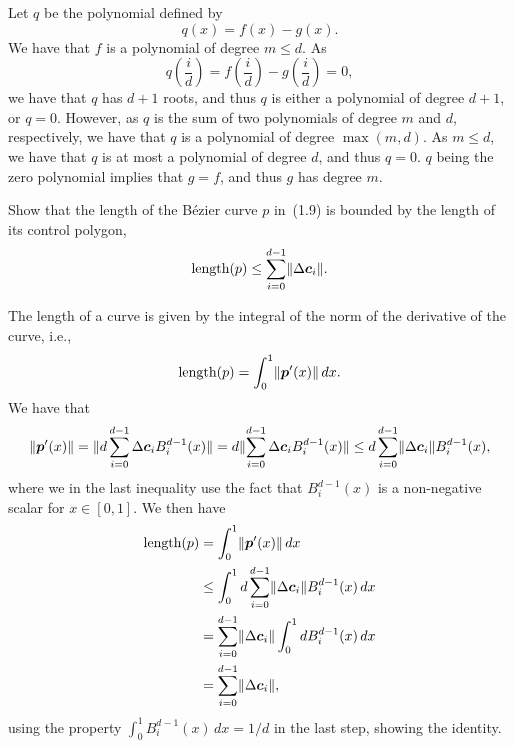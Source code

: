 \begin{solution}
    Let $q$ be the polynomial defined by
    \begin{equation*}
        q(x) = f(x) - g(x).
    \end{equation*}
    We have that $f$ is a polynomial of degree $m \leq d$.
    As
    \begin{equation*}
        q\left(\frac{i}{d}\right) = f\left(\frac{i}{d}\right) - g\left(\frac{i}{d}\right) = 0,
    \end{equation*}
    we have that $q$ has $d+1$ roots, and thus $q$ is either a polynomial of degree $d+1$, or $q = 0$.
    However, as $q$ is the sum of two polynomials of degree $m$ and $d$, respectively, we have that $q$ is a polynomial of degree $\max(m, d)$.
    As $m \leq d$, we have that $q$ is at most a polynomial of degree $d$, and thus $q = 0$.
    $q$ being the zero polynomial implies that $g = f$, and thus $g$ has degree $m$.
\end{solution}

\begin{exercise}
    Show that the length of the Bézier curve $p$ in~(1.9) is bounded by the length of its control polygon,
    \begin{equation*}
        \text{length}(p) \leq \sum_{i = 0}^{d-1} \lVert\Delta \boldsymbol{c}_i\rVert.
    \end{equation*}
\end{exercise}

\begin{solution}
    The length of a curve is given by the integral of the norm of the derivative of the curve, i.e.,
    \begin{equation*}
        \text{length}(p) = \int_0^1 \lVert \boldsymbol{p}'(x)\rVert \, dx.
    \end{equation*}
    We have that
    \begin{equation*}
        \lVert\boldsymbol{p}'(x)\rVert = \lVert d \sum_{i = 0}^{d-1} \Delta \boldsymbol{c}_i B_i^{d-1}(x)\rVert
        = d \lVert\sum_{i = 0}^{d-1} \Delta \boldsymbol{c}_i B_i^{d-1}(x)\rVert
        \leq d \sum_{i = 0}^{d-1} \lVert\Delta \boldsymbol{c}_i\rVert B_i^{d-1}(x),
    \end{equation*}
    where we in the last inequality use the fact that $B_{i}^{d-1}(x)$ is a non-negative scalar for $x \in [0, 1]$.
    We then have
    \begin{align*}
        \text{length}(p)
        &= \int_0^1 \lVert\boldsymbol{p}'(x)\rVert  \, dx \\
        &\leq \int_0^1 d \sum_{i = 0}^{d-1} \lVert\Delta \boldsymbol{c}_i\rVert B_{i}^{d-1} (x) \, dx \\
        &= \sum_{i = 0}^{d-1} \lVert\Delta \boldsymbol{c}_i\rVert \int_0^1 d B_{i}^{d-1} (x) \, dx \\
        &= \sum_{i = 0}^{d-1} \lVert\Delta \boldsymbol{c}_i\rVert,
    \end{align*}
    using the property $\int_0^1 B_i^{d-1}(x) \, dx = 1 / d$ in the last step, showing the identity.
\end{solution}